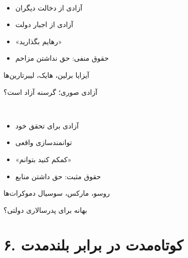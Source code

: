 \begin{tcolorbox}[
    enhanced,
    colback=lightbg,
    colframe=darkgray,
    boxrule=2pt,
    arc=8pt,
    sidebyside,
    sidebyside align=top,
    lefthand width=0.45\textwidth
]
\begin{center}
\textbf{\Large{}}\\[3mm]
\textbf{}
\end{center}

\begin{itemize}
    \item آزادی از دخالت دیگران
    \item آزادی از اجبار دولت
    \item «رهایم بگذارید»
    \item حقوق منفی: حق نداشتن مزاحم
\end{itemize}

\textbf{} آیزایا برلین، هایک، لیبرتارین‌ها

\textbf{} آزادی صوری؛ گرسنه آزاد است؟

\tcblower

\begin{center}
\textbf{\Large{}}\\[3mm]
\textbf{}
\end{center}

\begin{itemize}
    \item آزادی برای تحقق خود
    \item توانمندسازی واقعی
    \item «کمکم کنید بتوانم»
    \item حقوق مثبت: حق داشتن منابع
\end{itemize}

\textbf{} روسو، مارکس، سوسیال دموکرات‌ها

\textbf{} بهانه برای پدرسالاری دولتی؟
\end{tcolorbox}

\section*{۶. کوتاه‌مدت در برابر بلندمدت}

